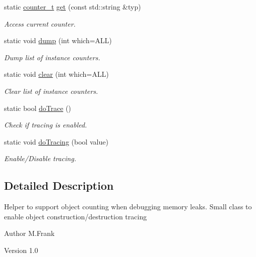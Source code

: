 \begin{DoxyCompactItemize}
static \hyperlink{struct_d_d4hep_1_1_instance_count_ae81dc0c76b135425e14b6dc38262a727}{counter\_\-t} \hyperlink{struct_d_d4hep_1_1_instance_count_aecb1277df454b018fc8144635c3dcb24}{get} (const std::string \&typ)
\begin{DoxyCompactList}\small\item\em Access current counter. \item\end{DoxyCompactList}\item 
static void \hyperlink{struct_d_d4hep_1_1_instance_count_ae9cc6db5c9117d6451a3d817c55af8c1}{dump} (int which=ALL)
\begin{DoxyCompactList}\small\item\em Dump list of instance counters. \item\end{DoxyCompactList}\item 
static void \hyperlink{struct_d_d4hep_1_1_instance_count_a94bb311b134800236d5be147df616072}{clear} (int which=ALL)
\begin{DoxyCompactList}\small\item\em Clear list of instance counters. \item\end{DoxyCompactList}\item 
static bool \hyperlink{struct_d_d4hep_1_1_instance_count_afa4f90d11074c40ba3bde59bb5c59785}{doTrace} ()
\begin{DoxyCompactList}\small\item\em Check if tracing is enabled. \item\end{DoxyCompactList}\item 
static void \hyperlink{struct_d_d4hep_1_1_instance_count_a12dd0a7dd1f4a64ef784dec2eda4b96a}{doTracing} (bool value)
\begin{DoxyCompactList}\small\item\em Enable/Disable tracing. \item\end{DoxyCompactList}\end{DoxyCompactItemize}


\subsection{Detailed Description}
Helper to support object counting when debugging memory leaks. Small class to enable object construction/destruction tracing

\begin{DoxyAuthor}{Author}
M.Frank 
\end{DoxyAuthor}
\begin{DoxyVersion}{Version}
1.0 
\end{DoxyVersion}


